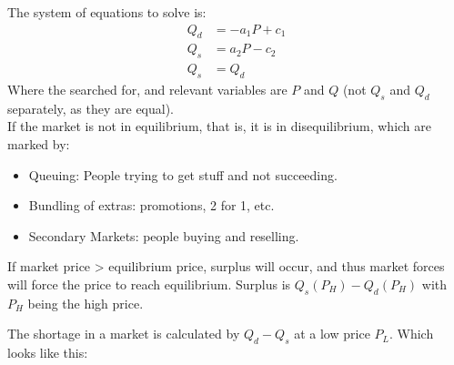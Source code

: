 \documentclass[nobib]{tufte-handout}
\begin{document}
The system of equations to solve is:
\begin{align*}
    Q_d & = -a_1P+c_1 \\
    Q_s & = a_2P-c_2  \\
    Q_s & =Q_d
\end{align*}
Where the searched for, and relevant variables are $P$ and $Q$ (not $Q_s$ and $Q_d$ separately, as they are equal).\\
If the market is not in equilibrium, that is, it is in disequilibrium, which are marked by:
\begin{itemize}
    \item Queuing: People trying to get stuff and not succeeding.
    \item Bundling of extras: promotions, 2 for 1, etc.
    \item Secondary Markets: people buying and reselling.
\end{itemize}
If market price > equilibrium price, surplus will occur, and thus market forces will force the price to reach equilibrium.
Surplus is $Q_s(P_H)-Q_d(P_H)$ with $P_H$ being the high price.
\begin{center}
\end{center}
The shortage in a market is calculated by $Q_d-Q_s$ at a low price $P_L$.
Which looks like this:
\end{document}
